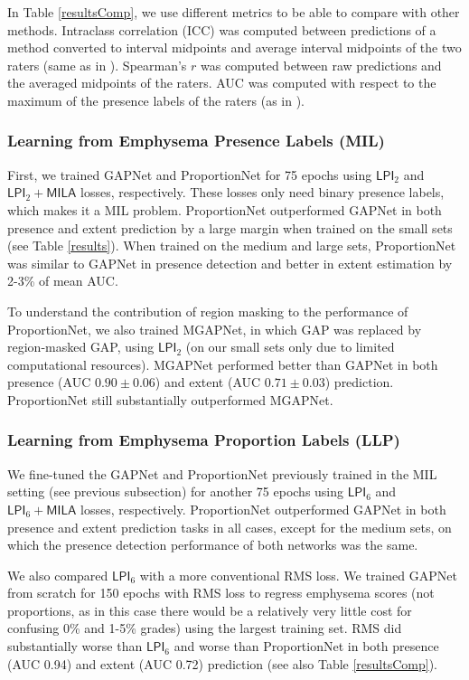 \documentclass{llncs}
\begin{document}
In Table \ref{resultsComp}, we use different metrics to be able to compare with other methods.
Intraclass correlation (ICC) was computed between  predictions of a method converted to interval midpoints and average interval midpoints of the two raters
(same as in \cite{Silas2016}).
Spearman's $r$ was computed between raw predictions and the averaged midpoints of the raters.
AUC was computed with respect to the maximum of the presence labels of the raters (as in \cite{Silas2018}).

\subsubsection{Learning from Emphysema Presence Labels (MIL)}

First, we trained GAPNet and ProportionNet for 75 epochs using $\textsf{LPI}_2$ and $\textsf{LPI}_2+\textsf{MILA}$ losses, respectively.
These losses only need binary presence labels, which makes it a MIL problem.
ProportionNet outperformed GAPNet in both presence and extent prediction by a large margin when trained on the small sets (see Table \ref{results}).
When trained on the medium and large sets, ProportionNet was similar to GAPNet in presence detection and better in extent estimation by 2-3\% of mean AUC. 

To understand the contribution of region masking to the performance of ProportionNet, we also trained MGAPNet, in which GAP was replaced by region-masked GAP, using $\textsf{LPI}_2$ (on our small sets only due to limited computational resources).
MGAPNet performed better than GAPNet in both presence (AUC $0.90\pm0.06$) and extent (AUC $0.71\pm0.03$) prediction.
ProportionNet still substantially outperformed MGAPNet.

\subsubsection{Learning from Emphysema Proportion Labels (LLP)}

We fine-tuned the GAPNet and ProportionNet previously trained in the MIL setting (see previous subsection) for another 75 epochs using $\textsf{LPI}_6$ and $\textsf{LPI}_6 + \textsf{MILA}$ losses, respectively.
ProportionNet outperformed GAPNet in both presence and extent prediction tasks in all cases, except for the medium sets, on which the presence detection performance of both networks was the same.

We also compared $\textsf{LPI}_6$ with a more conventional RMS loss.
We trained GAPNet from scratch for 150 epochs with RMS loss to regress emphysema scores (not proportions, as in this case there would be a relatively very little cost for confusing 0\% and 1-5\% grades) using the largest training set.
RMS did substantially worse than $\textsf{LPI}_6$ and worse than ProportionNet in both presence (AUC 0.94) and extent (AUC 0.72) prediction (see also Table \ref{resultsComp}).
\end{document}
